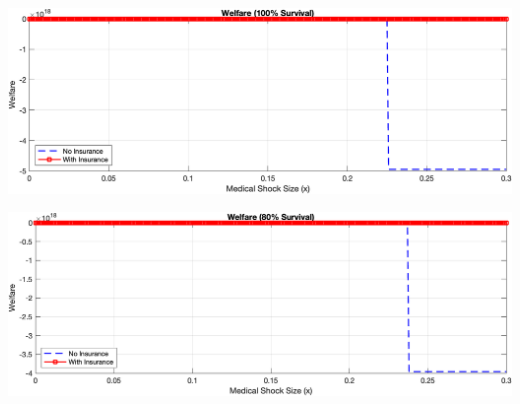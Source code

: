\documentclass[10pt,a4paper]{article}
\begin{document}
\includegraphics*[width=\textwidth]{100-c.png} 

\includegraphics[width = \textwidth]{80-c.png}
\end{document}

